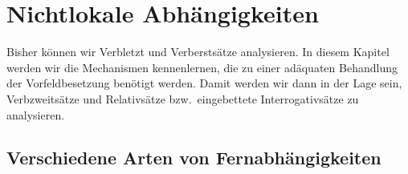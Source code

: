 
\chapter{Nichtlokale Abhängigkeiten}
\label{Kapitel-nla}

Bisher können wir Verbletzt und Verberstsätze analysieren. In diesem Kapitel werden wir
die Mechanismen kennenlernen, die zu einer adäquaten Behandlung der Vorfeldbesetzung benötigt
werden. Damit werden wir dann in der Lage sein, Verbzweitsätze und Relativsätze bzw.\ eingebettete Interrogativsätze zu analysieren.

\section{Verschiedene Arten von Fernabhängigkeiten}

